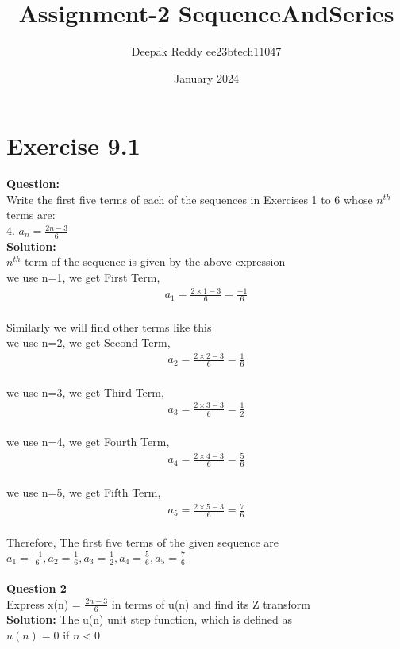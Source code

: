\documentclass[journal,12pt,twocolumn]{IEEEtran}
\title{Assignment-2 SequenceAndSeries}
\author{Deepak Reddy ee23btech11047}
\date{January 2024}
\theoremstyle{remark}
\begin{document}
\maketitle
\section*{Exercise 9.1}
\textbf{Question:}\\
Write the first five terms of each of the sequences in Exercises 1 to 6 whose $n^{th}$
terms are:\\
4. $a_n = \frac{2n-3}{6}$\\
\textbf{Solution:}\\
$n^{th}$ term of the sequence is given by the above expression\\
we use n=1, we get First Term,
\begin{align}a_1 = \frac{2 \times 1 - 3}{6} = \frac{-1}{6} \end{align}\\
Similarly we will find other terms like this\\
we use n=2, we get Second Term,
\begin{align} a_{2} = \frac{2 \times 2 - 3}{6} = \frac{1}{6}  \end{align}\\
we use n=3, we get Third Term,
\begin{align} a_{3} = \frac{2 \times 3 - 3}{6} = \frac{1}{2} \end{align}\\
we use n=4, we get Fourth Term,
\begin{align} a_{4} = \frac{2 \times 4 - 3}{6} = \frac{5}{6} \end{align}\\
we use n=5, we get Fifth Term,
\begin{align} a_{5} = \frac{2 \times 5 - 3}{6} = \frac{7}{6} \end{align}\\
Therefore, The first five terms of the given sequence are
$a_1 = \frac{-1}{6}, a_2 = \frac{1}{6},a_3 = \frac{1}{2}, a_4 = \frac{5}{6},a_5 = \frac{7}{6}$\\
\\
\textbf{Question 2}\\
Express x(n) = $\frac{2n-3}{6}$ in terms of u(n) and find its Z transform\\
\textbf{Solution:}
The u(n) unit step function, which is defined as\\
$u(n) = 0$ if $ n < 0 $\\
\end{document}
